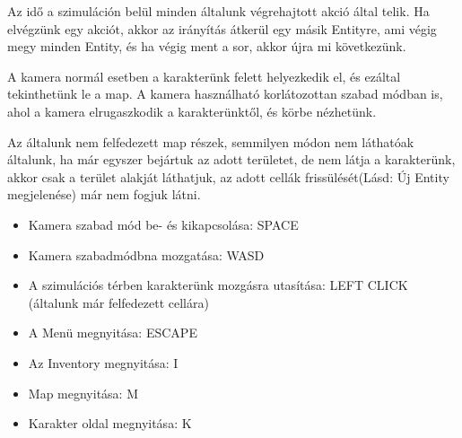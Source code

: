 
Az idő a szimuláción belül minden általunk végrehajtott akció által telik.
Ha elvégzünk egy akciót, akkor az irányítás átkerül egy másik Entityre,
ami végig megy minden Entity, és ha végig ment a sor, akkor újra mi következünk.


A kamera normál esetben a karakterünk felett helyezkedik el, és ezáltal tekinthetünk le a map.
A kamera használható korlátozottan szabad módban is, ahol a kamera elrugaszkodik a karakterünktől, és körbe nézhetünk.


Az általunk nem felfedezett map részek, semmilyen módon nem láthatóak általunk, ha már egyszer bejártuk az adott területet, 
de nem látja a karakterünk, akkor csak a terület alakját láthatjuk, az adott cellák frissülését(Lásd: Új Entity megjelenése) már nem fogjuk látni.


\begin{itemize}
    \item Kamera szabad mód be- és kikapcsolása: SPACE
    \item Kamera szabadmódbna mozgatása: WASD
    \item A szimulációs térben karakterünk mozgásra utasítása: LEFT CLICK (általunk már felfedezett cellára)
    \item A Menü megnyitása: ESCAPE
    \item Az Inventory megnyitása: I
    \item Map megnyitása: M
    \item Karakter oldal megnyitása: K
\end{itemize}

